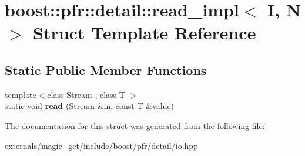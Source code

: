 \hypertarget{structboost_1_1pfr_1_1detail_1_1read__impl}{}\section{boost\+:\+:pfr\+:\+:detail\+:\+:read\+\_\+impl$<$ I, N $>$ Struct Template Reference}
\label{structboost_1_1pfr_1_1detail_1_1read__impl}
\subsection*{Static Public Member Functions}
\begin{DoxyCompactItemize}
\item 
\mbox{\label{structboost_1_1pfr_1_1detail_1_1read__impl_a4a967008ddb852b24793fae8aede2967}} 
{\footnotesize template$<$class Stream , class T $>$ }\\static void {\bfseries read} (Stream \&in, const \mbox{\hyperlink{struct_t}{T}} \&value)
\end{DoxyCompactItemize}


The documentation for this struct was generated from the following file\+:\begin{DoxyCompactItemize}
\item 
externals/magic\+\_\+get/include/boost/pfr/detail/io.\+hpp\end{DoxyCompactItemize}
